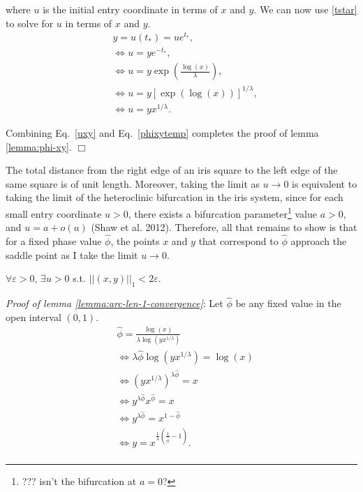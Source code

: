 where $u$ is the initial entry coordinate in terms of $x$ and $y$.  We can now use \eqref{tstar} to solve for $u$ in terms of $x$ and $y$.
\begin{equation}
\begin{split}\label{uxy}
&y = u(t_*) = u e^{t_*},\\
&\Leftrightarrow u = y e^{-t_*},\\
&\Leftrightarrow u = y \exp{\left (\frac{\log(x)}{\lambda} \right )},\\
&\Leftrightarrow u = y \left [\exp{(\log(x))} \right ]^{1/\lambda},\\
&\Leftrightarrow u = y x^{1/\lambda}.
\end{split}
\end{equation}

Combining Eq.~\eqref{uxy} and Eq.~\eqref{phixytemp} completes the proof of lemma \ref{lemma:phi-xy}. $\Box$

The total distance from the right edge of an iris square to the left edge of the same square is of unit length. Moreover, taking the limit as $u \rightarrow 0$ is equivalent to taking the limit of the heteroclinic bifurcation in the iris system, since for each small entry coordinate $u > 0$, there exists a bifurcation parameter\footnote{??? isn't the bifurcation at $a=0$?} value $a>0$, and $u = a + o(u)$ (Shaw et al. 2012). Therefore, all that remains to show is that for a fixed phase value $\hat{\phi}$, the points $x$ and $y$ that correspond to $\hat{\phi}$ approach the saddle point as I take the limit $u \rightarrow 0$.

\begin{lemma}
 $\forall \varepsilon > 0$, $\exists u >0$ s.t. $||(x,y)||_1 < 2\varepsilon$.  
\label{lemma:arc-len-1-convergence}\end{lemma}
\textit{Proof of lemma \ref{lemma:arc-len-1-convergence}}: Let $\hat\phi$ be any fixed value in the open interval $(0,1)$.
\begin{equation}
\begin{split}
&\hat\phi = \frac{\log(x)}{\lambda \log(y x^{1/\lambda})}\\
&\Leftrightarrow\lambda \hat\phi \log(yx^{1/\lambda}) = \log(x)\\
&\Leftrightarrow (y x^{1/\lambda})^{\lambda \hat\phi} = x\\
&\Leftrightarrow y^{\lambda \hat\phi} x^{\hat\phi} = x\\
&\Leftrightarrow y^{\lambda \hat\phi}  =x^{1-\hat\phi}\\
&\Leftrightarrow y  =x^{\frac{1}{\lambda}(\frac{1}{\hat\phi} - 1)}.\\
\end{split}
\end{equation}

